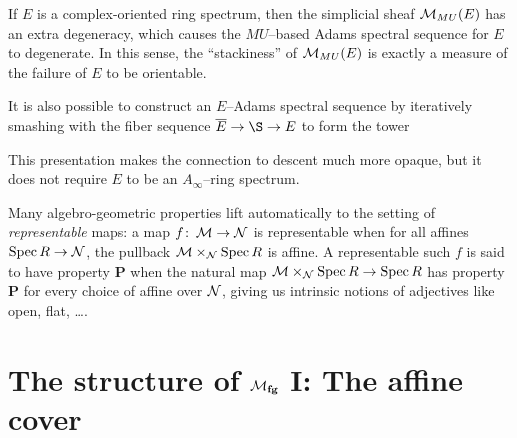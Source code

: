 \begin{remark}\label{StackinessMeasuresNonorientability}
If \(E\) is a complex-oriented ring spectrum, then the simplicial sheaf \(\mathcal{M}_{MU}(E)\) has an extra degeneracy, which causes the \(MU\)--based Adams spectral sequence for \(E\) to degenerate.  In this sense, the ``stackiness'' of \(\mathcal{M}_{MU}(E)\) is exactly a measure of the failure of \(E\) to be orientable.
\end{remark}

\begin{remark}
It is also possible to construct an \(E\)--Adams spectral sequence by iteratively smashing with the fiber sequence \(\overline E \to \S \to E\) to form the tower
\begin{center}
\end{center}
This presentation makes the connection to descent much more opaque, but it does not require \(E\) to be an \(A_\infty\)--ring spectrum.
\end{remark}

\begin{remark}
Many algebro-geometric properties lift automatically to the setting of \textit{representable} maps: a map \(f\colon\thinspace \mathcal{M} \to \mathcal{N}\) is representable when for all affines \(\operatorname{Spec} R \to \mathcal{N}\), the pullback \(\mathcal{M} \times_{\mathcal{N}} \operatorname{Spec} R\) is affine.  A representable such \(f\) is said to have property \textbf{P} when the natural map \(\mathcal{M} \times_{\mathcal{N}} \operatorname{Spec} R \to \operatorname{Spec} R\) has property \textbf{P} for every choice of affine over \(\mathcal{N}\), giving us intrinsic notions of adjectives like open, flat, \ldots.
\end{remark}










\section{The structure of \texorpdfstring{\(\mathcal{M}_{\mathbf{fg}}\)}{Mfg} I: The affine cover}\label{MfgI:AffineCover}

